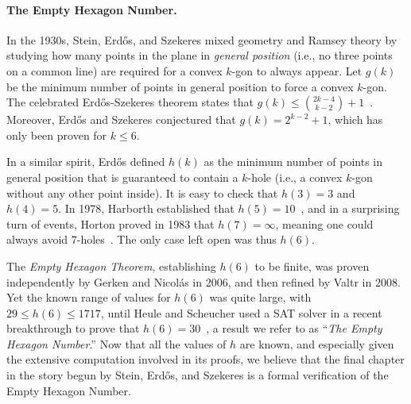 \paragraph{The Empty Hexagon Number.}
In the 1930s, Stein, Erd\H{o}s, and Szekeres mixed geometry and Ramsey theory by studying how many points in the plane in \emph{general position} (i.e., no three points on a common line) are required for a convex $k$-gon to always appear. Let $g(k)$ be the minimum number of points in general position to force a convex $k$-gon.
The celebrated Erd\H{o}s-Szekeres theorem states that $g(k) \leq \binom{2k-4}{k-2} + 1$~\cite{erdosCombinatorialProblemGeometry2009}. Moreover, Erd\H{o}s and Szekeres conjectured that $g(k) = 2^{k-2} + 1$, which has only been proven for $k \leq 6$.

In a similar spirit, Erd\H{o}s defined $h(k)$ as the minimum number of points in general position that is guaranteed to contain a $k$-hole (i.e., a convex $k$-gon without any other point inside).
It is easy to check that $h(3) = 3$ and $h(4) = 5$. In 1978, Harborth established that $h(5) = 10$~\cite{Harborth1978}, and in a surprising turn of events, Horton proved in 1983 that $h(7) = \infty$, meaning one could always avoid $7$-holes~\cite{hortonSetsNoEmpty1983}. 
The only case left open was thus $h(6)$.

The \emph{Empty Hexagon Theorem}, establishing $h(6)$ to be finite, was proven independently by Gerken and Nicolás in 2006, and then refined by Valtr in 2008.
Yet the known range of values for $h(6)$ was quite large, with $29 \leq h(6) \leq 1717$, until Heule and Scheucher used a SAT solver in a recent breakthrough to prove that $h(6) = 30$~\cite{emptyHexagonNumber}, a result we refer to as ``\emph{The Empty Hexagon Number}.''
Now that all the values of $h$ are known, and especially given the extensive computation involved in its proofs, we believe that the final chapter in the story begun by Stein, Erd\H{o}s, and Szekeres is a formal verification of the Empty Hexagon Number.

